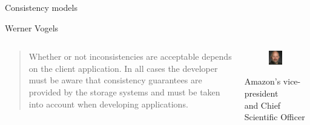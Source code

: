 \begin{frame}{Consistency models}

\begin{block}{Werner Vogels}

\begin{columns}
\begin{column}{0.59\textwidth}
\begin{quote}
Whether or not inconsistencies are acceptable depends on the client application. 
In all cases \alert{the developer must be aware} that consistency guarantees
are provided by the storage systems and must be taken into account when
developing applications.
\end{quote}

{\footnotesize
{}
}
\end{column}
\begin{column}{0.39\textwidth}
\begin{figure}
	\includegraphics[width=0.8\textwidth]{figs/09/werner}
\end{figure}
Amazon's vice-president\\ and Chief Scientific Officer
\end{column}
\end{columns}

\end{block}


\end{frame}

